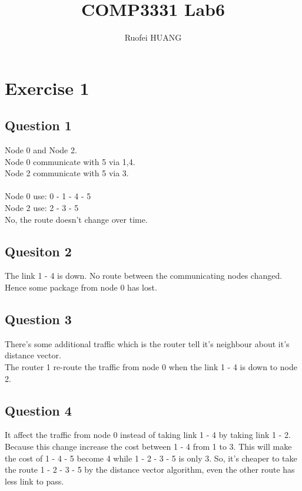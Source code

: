 \documentclass{article}
\begin{document}
\title{COMP3331 Lab6}
\author{Ruofei HUANG}

\maketitle

\section{Exercise 1}
\subsection{Question 1}

Node 0 and Node 2. \\
Node 0 communicate with 5 via 1,4.\\
Node 2 communicate with 5 via 3.\\ \\
Node 0 use: 0 - 1 - 4 - 5\\
Node 2 use: 2 - 3 - 5 \\
No, the route doesn't change over time.

\subsection{Quesiton 2}

The link 1 - 4 is down. No route between the communicating nodes changed. Hence some package from node 0 has lost.

\subsection{Question 3}

There's some additional traffic which is the router tell it's neighbour about it's distance vector. \\
The router 1 re-route the traffic from node 0 when the link 1 - 4 is down to node 2. 

\subsection{Question 4}

It affect the traffic from node 0 instead of taking link 1 - 4 by taking link 1 - 2. Because this change increase the cost between 1 - 4 from 1 to 3. This will make the cost of 1 - 4 - 5 become 4 while 1 - 2 - 3 - 5 is only 3. So, it's cheaper to take the route 1 - 2 - 3 - 5 by the distance vector algorithm, even the other route has less link to pass.
\end{document}
